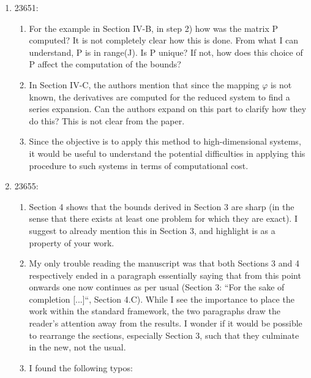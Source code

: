 \documentclass[letterpaper, 10 pt, conference, dvipsnames]{ieeeconf}
\begin{document}
\begin{enumerate}
\begin{enumerate}
    \end{enumerate}
    \item 23651: 
    \begin{enumerate}
        \item For the example in Section IV-B, in step 2) how was the matrix P computed? It is not completely clear how this is done. From what I can understand, P is in range(J). Is P unique? If not, how does this choice of P affect the computation of the bounds? 
        \item In Section IV-C, the authors mention that since the mapping $\varphi$ is not known, the derivatives are computed for the reduced system to find a series expansion. Can the authors expand on this part to clarify how they do this? This is not clear from the paper. 
        \item Since the objective is to apply this method to high-dimensional systems, it would be useful to understand the potential difficulties in applying this procedure to such systems in terms of computational cost. 
    \end{enumerate}
    \item 23655: 
    \begin{enumerate}
        \item Section 4 shows that the bounds derived in Section 3 are sharp (in the sense that there exists at least one problem for which they are exact). I suggest to already mention this in Section 3, and highlight is as a property of your work. 
        \item My only trouble reading the manuscript was that both Sections 3 and 4 respectively ended in a paragraph essentially saying that from this point onwards one now continues as per usual (Section 3: “For the sake of completion [...]“, Section 4.C). While I see the importance to place the work within the standard framework, the two paragraphs draw the reader's attention away from the results. I wonder if it would be possible to rearrange the sections, especially Section 3, such that they culminate in the new, not the usual. 
        \item I found the following typos:

\end{enumerate}
\end{enumerate}
\end{document}

